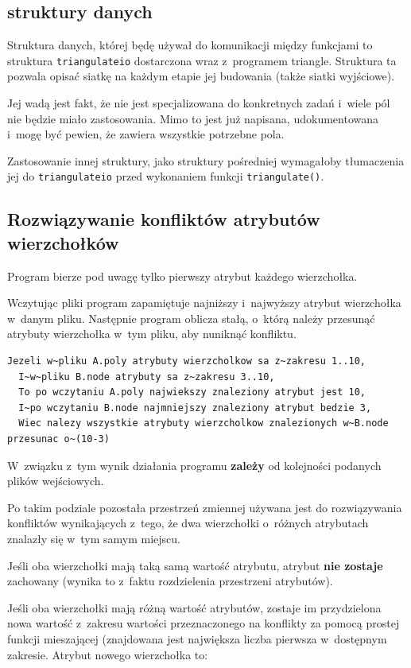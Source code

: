 \documentclass[a4paper]{article}
\begin{document}
\subsection{struktury danych}
Struktura danych, której będę używał do komunikacji między funkcjami to struktura \texttt{triangulateio} dostarczona wraz z~programem triangle.
Struktura ta pozwala opisać siatkę na każdym etapie jej budowania (także siatki wyjściowe).

Jej wadą jest fakt, że nie jest specjalizowana do konkretnych zadań i~wiele pól nie będzie miało zastosowania.
Mimo to jest już napisana, udokumentowana i~mogę być pewien, że zawiera wszystkie potrzebne pola.

Zastosowanie innej struktury, jako struktury pośredniej wymagałoby tłumaczenia jej do \texttt{triangulateio} przed wykonaniem funkcji \texttt{triangulate()}.

\subsection{Rozwiązywanie konfliktów atrybutów wierzchołków}
Program bierze pod uwagę tylko pierwszy atrybut każdego wierzchołka.

Wczytując pliki program zapamiętuje najniższy i~najwyższy atrybut wierzchołka w~danym pliku.
Następnie program oblicza stałą, o~którą należy przesunąć atrybuty wierzchołka w~tym pliku, aby nuniknąć konfliktu.

\begin{lstlisting}[caption=Przykład]
  Jezeli w~pliku A.poly atrybuty wierzcholkow sa z~zakresu 1..10,
  I~w~pliku B.node atrybuty sa z~zakresu 3..10,
  To po wczytaniu A.poly najwiekszy znaleziony atrybut jest 10,
  I~po wczytaniu B.node najmniejszy znaleziony atrybut bedzie 3,
  Wiec nalezy wszystkie atrybuty wierzcholkow znalezionych w~B.node przesunac o~(10-3)
\end{lstlisting}

W~związku z~tym wynik działania programu \textbf{zależy} od kolejności podanych plików wejściowych.

Po takim podziale pozostała przestrzeń zmiennej używana jest do rozwiązywania konfliktów wynikających z~tego, że dwa wierzchołki o~różnych atrybutach znalazły się w~tym samym miejscu.

Jeśli oba wierzchołki mają taką samą wartość atrybutu, atrybut \textbf{nie zostaje} zachowany (wynika to z~faktu rozdzielenia przestrzeni atrybutów).

Jeśli oba wierzchołki mają różną wartość atrybutów, zostaje im przydzielona nowa wartość z~zakresu wartości przeznaczonego na konflikty za pomocą prostej funkcji mieszającej
(znajdowana jest największa liczba pierwsza w~dostępnym zakresie. Atrybut nowego wierzchołka to:
\end{document}
